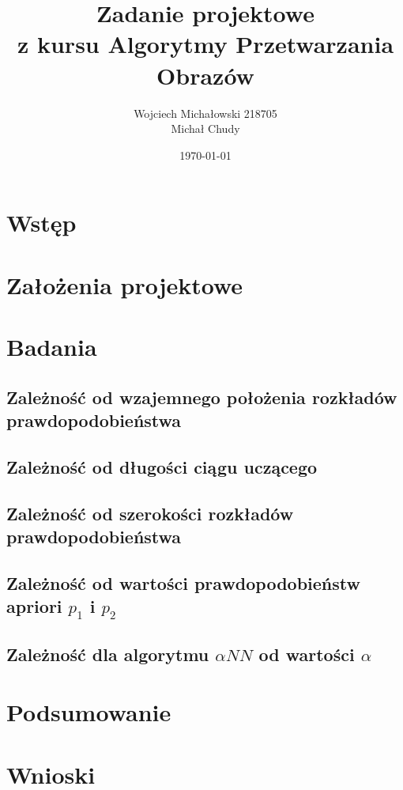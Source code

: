 \documentclass[12pt]{article}
\title{Zadanie projektowe\\z kursu Algorytmy Przetwarzania Obrazów}
\author{
        Wojciech Michałowski 218705\\
        Michał Chudy
}
\date{\today}
\begin{document}
\maketitle

\section {Wstęp}

\section {Założenia projektowe}

\section {Badania}

\subsection {Zależność od wzajemnego położenia rozkładów
  prawdopodobieństwa}
\subsection {Zależność od długości ciągu uczącego}
\subsection {Zależność od szerokości rozkładów prawdopodobieństwa}
\subsection {Zależność od wartości prawdopodobieństw apriori $p_{1}$ i $p_{2}$}
\subsection {Zależność dla algorytmu $\alpha NN$ od wartości $\alpha$}

\section {Podsumowanie}

\section {Wnioski}
\end{document}
